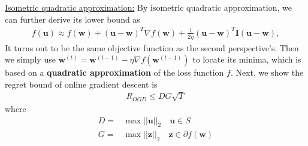 \documentclass[11pt]{article}
\begin{document}
\underline{Isometric quadratic approximation:} 
By isometric quadratic approximation, we can further derive its lower bound as 
\begin{equation*}
\begin{split}
f(\mathbf{u}) \approx f(\mathbf{w}) + (\mathbf{u}-\mathbf{w})^T \nabla f(\mathbf{w}) + \frac{1}{2\eta} (\mathbf{u}-\mathbf{w})^T \boldsymbol{I} (\mathbf{u}-\mathbf{w}),
\end{split}
\end{equation*}
It turns out to be the same objective function as the second perspective's. Then we simply use $\mathbf{w}^{(t)} = \mathbf{w}^{(t-1)} - \eta \nabla f(\mathbf{w}^{(t-1)})$ to locate its minima, which is based on a \textbf{quadratic approximation} of the loss function $f$. 
Next, we show the regret bound of online gradient descent is 
\begin{align*}
    R_{OGD} \leq DG\sqrt{T} \nonumber
\end{align*} where
\begin{align*}
    D = &\max ||\mathbf{u}||_2 \quad \mathbf{u}\in S \nonumber\\
    G = &\max ||\mathbf{z}||_2 \quad \mathbf{z}\in \partial f(\mathbf{w}) \nonumber
\end{align*}
\end{document}
